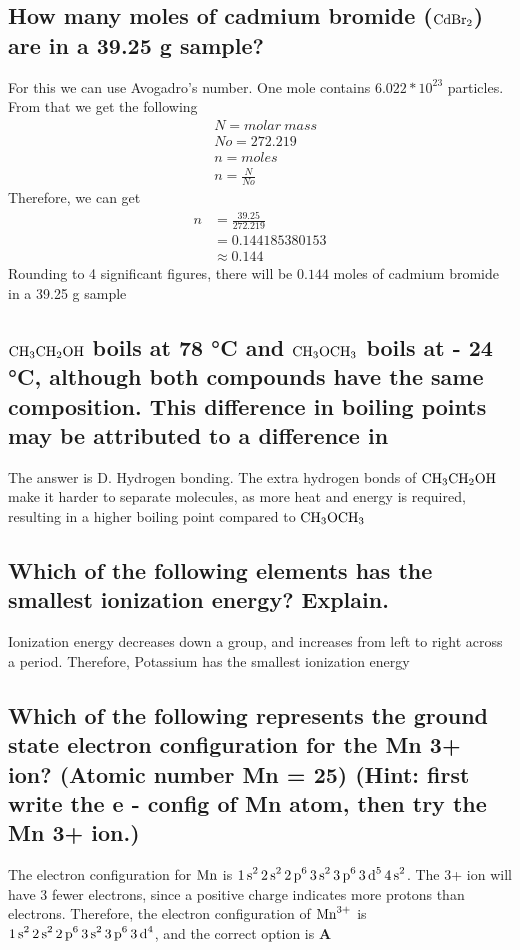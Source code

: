 \documentclass[11pt]{article}
\begin{document}
\subsection{How many moles of cadmium bromide (\(\ce{CdBr2}\)) are in a 39.25 g sample?}
\label{sec:org9de97b2}
For this we can use Avogadro's number. One mole contains \(6.022*10^{23}\) particles. From that we get the following
\begin{align*}
&N = molar\ mass\\
&No = 272.219\\
&n = moles\\
&n=\frac{N}{No}
\end{align*}
Therefore, we can get
\begin{align*}
n&= \frac{39.25}{272.219}\\
&=0.144185380153\\
&\approx0.144
\end{align*}
Rounding to 4 significant figures, there will be \(0.144\) moles of cadmium bromide in a 39.25 g sample

\subsection{\(\ce{CH3CH2OH}\) boils at 78 °C and \(\ce{CH3OCH3}\) boils at - 24 °C, although both compounds have the same composition. This difference in boiling points may be attributed to a difference in}
\label{sec:org8d8f7be}
The answer is D. Hydrogen bonding. The extra hydrogen bonds of \(\ce{CH3CH2OH}\) make it harder to separate molecules, as more heat and energy is required, resulting in a higher boiling point compared to \(\ce{CH3OCH3}\)

\subsection{Which of the following elements has the smallest ionization energy? Explain.}
\label{sec:orgf364ade}
Ionization energy decreases down a group, and increases from left to right across a period. Therefore, Potassium has the smallest ionization energy

\subsection{Which of the following represents the ground state electron configuration for the Mn 3+ ion? (Atomic number Mn = 25) (Hint: first write the e - config of Mn atom, then try the Mn 3+ ion.)}
\label{sec:org4fc3cb4}
The electron configuration for \(\ce{Mn}\) is \(\ce{1s^2 2s^2 2p^6 3s^2 3p^6 3d^5 4s^2}\). The 3+ ion will have 3 fewer electrons, since a positive charge indicates more protons than electrons. Therefore, the electron configuration of \(\ce{Mn^{3+}}\) is \(\ce{1s^2 2s^2 2p^6 3s^2 3p^6 3d^4}\), and the correct option is \textbf{A}
\end{document}
